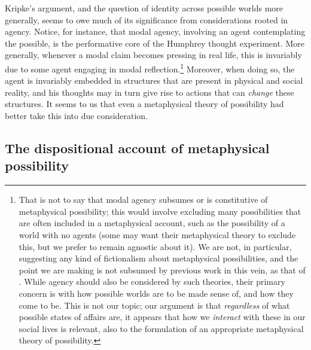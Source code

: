 \documentclass{article}
\begin{document}
Kripke's argument, and the question of identity across possible worlds more generally, seems to owe much of its significance from considerations rooted in agency. Notice, for instance, that modal agency, involving an agent contemplating the possible, is the performative core of the Humphrey thought experiment. More generally, whenever a modal claim becomes pressing in real life, this is invariably due to some agent engaging in modal reflection.\footnote{That is not to say that modal agency subsumes or is constitutive of metaphysical possibility; this would involve excluding many possibilities that are often included in a metaphysical account, such as the possibility of a world with no agents (some may want their metaphysical theory to exclude this, but we prefer to remain agnostic about it). We are not, in particular, suggesting any kind of fictionalism about metaphysical possibilities, and the point we are making is not subsumed by previous work in this vein, as that of \cite{ficr,ficrfix}. While agency should also be considered by such theories, their primary concern is with how possible worlds are to be made sense of, and how they come to be. This is not our topic; our argument is that \emph{regardless} of what possible states of affairs are, it appears that how we \emph{interact} 
with these in our social lives is relevant, also to the formulation of an appropriate metaphysical theory of possibility.} Moreover, when doing so, the agent is invariably embedded in structures that are present in physical and social reality, and his thoughts may in turn give rise to actions that can \emph{change} these structures. It seems to us that even a metaphysical theory of possibility had better take this into due consideration.

\subsection*{The dispositional account of metaphysical possibility}
\end{document}
